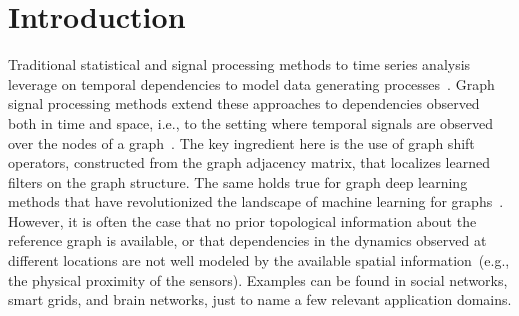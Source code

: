 \section{Introduction}

Traditional statistical and signal processing methods to time series analysis leverage on temporal dependencies to model data generating processes~\citep{harvey1990forecasting}.
Graph signal processing methods extend these approaches to dependencies observed both in time and space, i.e., to the setting where temporal signals are observed over the nodes of a graph~\citep{ortega2018graph, stankovic2020graph2,di2018adaptive, isufi2019forecasting}. The key ingredient here is the use of graph shift operators, constructed from the graph adjacency matrix, that localizes learned filters on the graph structure. The same holds true for graph deep learning methods that have revolutionized the landscape of machine learning for graphs~\citep{bruna2014spectral, bronstein2017geometric, bacciu2020gentle, bronstein2021geometric}. 
However, it is often the case that no prior topological information about the reference graph is available, or that dependencies in the dynamics observed at different locations are not well modeled by the available spatial information~(e.g., the physical proximity of the sensors). Examples can be found in social networks, smart grids, and brain networks, just to name a few relevant application domains. 

